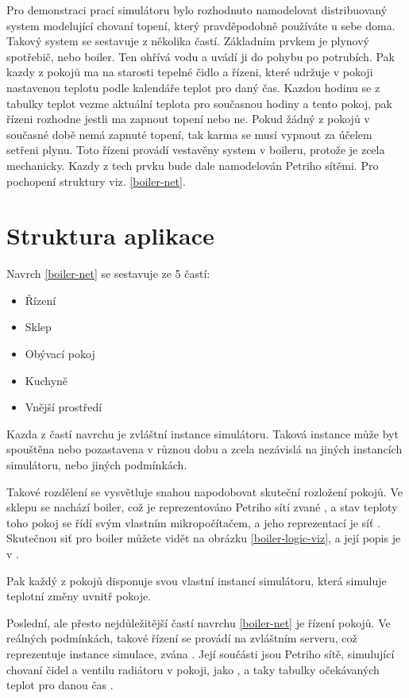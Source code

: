 Pro demonstraci prací simulátoru bylo rozhodnuto namodelovat distribuovaný system modelující chovaní topení, který pravděpodobně používáte u sebe doma. Takový system se sestavuje z několika častí. Základním prvkem je plynový spotřebič, nebo boiler. Ten ohřívá vodu a uvádí ji do pohybu po potrubích. Pak kazdy z pokojů ma na starosti tepelné čidlo a řízeni, které udržuje v pokoji nastavenou teplotu podle kalendáře teplot pro daný čas. Kazdou hodinu se z tabulky teplot vezme aktuální teplota pro současnou hodiny a tento pokoj, pak řízeni rozhodne jestli ma zapnout topení nebo ne. Pokud žádný z pokojů v současné době nemá zapnuté topení, tak karma se musí vypnout za účelem setřeni plynu. Toto řízeni provádí vestavěny system v boileru, protože je zcela mechanicky. Kazdy z tech prvku bude dale namodelován Petriho sítěmi. Pro pochopení struktury viz. \ref{boiler-net}.

\section{Struktura aplikace}

Navrch \ref{boiler-net} se sestavuje ze 5 častí:
\begin{itemize}
  \item Řízení
  \item Sklep
  \item Obývací pokoj
  \item Kuchyně
  \item Vnější prostředí
\end{itemize}
Kazda z častí navrchu je zvláštní instance simulátoru. Taková instance může byt spouštěna nebo pozastavena v různou dobu a zcela nezávislá na jiných instancích simulátoru, nebo jiných podmínkách.

Takové rozdělení se vysvětluje snahou napodobovat skuteční rozložení pokojů. Ve sklepu se nachází boiler, což je reprezentováno Petriho sítí zvané , a stav teploty toho pokoj se řídí svým vlastním mikropočítačem, a jeho reprezentací je síť . Skutečnou siť pro boiler můžete vidět na obrázku \ref{boiler-logic-viz}, a její popis je v \todo{}.

Pak každý z pokojů disponuje svou vlastní instancí simulátoru, která simuluje teplotní změny uvnitř pokoje.

Poslední, ale přesto nejdůležitější častí navrchu \ref{boiler-net} je řízení pokojů. Ve reálných podmínkách, takové řízení se provádí na zvláštním serveru, což reprezentuje instance simulace, zvána . Její součásti jsou Petriho sítě, simulující chovaní čidel a ventilu radiátoru v pokoji, jako , a taky tabulky očekávaných teplot pro danou čas .

